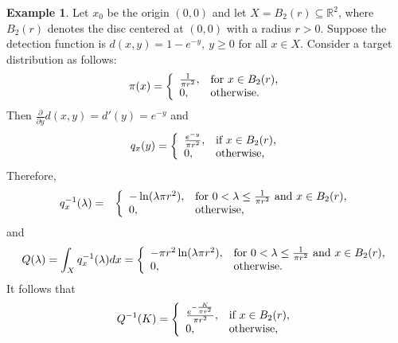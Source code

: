 \documentclass[12pt]{article}
\theoremstyle{plain}
\theoremstyle{definition}
\newtheorem{example}{Example}%
\theoremstyle{remark}
\begin{document}
\begin{example}%
\label{ex:continuous1}
Let $x_0$ be the origin $(0, 0)$ and let $X=B_2(r)\subseteq \mathbb{R}^2$, where $B_2(r)$ denotes the disc centered at $(0, 0)$ with a radius $r>0$.  Suppose  the detection function is $d(x, y)=1-e^{-y}, \ y\geq 0$ for all $x\in X$.  Consider a  target distribution as follows:
\[
\pi(x)=\left\{
		                           \begin{array}{ll}
		                           \frac{1}{\pi r^2},& \hbox{for $x\in B_2(r)$,} \\
					0,  & \hbox{otherwise.} 
		                          \end{array}
		                         \right.
\]
Then $\frac{\partial}{\partial y}d(x,y)=d'(y)=e^{-y}$ and 
\[
q_x(y)=\left\{
		                           \begin{array}{ll}
		                           \frac{e^{-y}}{\pi r^2} ,& \hbox{if $x\in B_2(r)$,} \\
					0,  & \hbox{otherwise,} 
		                          \end{array}
		                         \right.
\]
Therefore,
\begin{eqnarray*}
q_x^{-1}(\lambda) 		            &=& \left\{
		                           \begin{array}{ll}
		                          \text{$-\ln (\lambda \pi r^2)$},& \hbox{for $0<\lambda \leq \frac{1}{\pi r^2}$ and $x\in B_2(r)$,} \\
					0,  & \hbox{otherwise,} 
		                          \end{array}
		                         \right.
\end{eqnarray*}
and 
\[
Q(\lambda)=\int_X q_x^{-1}(\lambda)dx= \left\{
		                           \begin{array}{ll}
		                          \text{$-\pi r^2 \ln (\lambda \pi r^2)$},& \hbox{for $0<\lambda \leq \frac{1}{\pi r^2}$ and $x\in B_2(r)$,} \\
					0,  & \hbox{otherwise.} 
		                          \end{array}
		                         \right.
\]
It follows that
\[
Q^{-1}(K)=\left\{
		                           \begin{array}{ll}
		                           \frac{e^{-\frac{K}{\pi r^2}}}{\pi r^2} ,& \hbox{if $x\in B_2(r)$,} \\
					0,  & \hbox{otherwise,} 
		                          \end{array}
		                         \right.
\]
\end{example}
\end{document}

